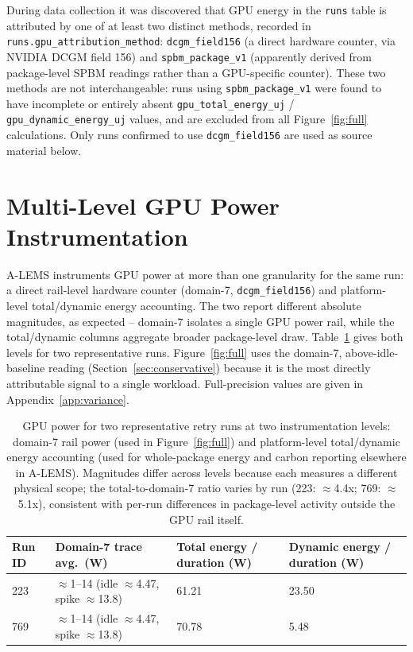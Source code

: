 \documentclass[10pt]{article}
\begin{document}
During data collection it was discovered that GPU energy in the
\texttt{runs} table is attributed by one of at least two distinct methods,
recorded in \texttt{runs.gpu\_attribution\_method}: \texttt{dcgm\_field156}
(a direct hardware counter, via NVIDIA DCGM field 156) and
\texttt{spbm\_package\_v1} (apparently derived from package-level SPBM
readings rather than a GPU-specific counter). These two methods are not
interchangeable: runs using \texttt{spbm\_package\_v1} were found to have
incomplete or entirely absent \texttt{gpu\_total\_energy\_uj} /
\texttt{gpu\_dynamic\_energy\_uj} values, and are excluded from all
Figure~\ref{fig:full} calculations. Only runs confirmed to use \texttt{dcgm\_field156}
are used as source material below.

\section{Multi-Level GPU Power Instrumentation}
\label{sec:reconciliation}

A-LEMS instruments GPU power at more than one granularity for the same run:
a direct rail-level hardware counter (domain-7, \texttt{dcgm\_field156}) and
platform-level total/dynamic energy accounting. The two report different
absolute magnitudes, as expected -- domain-7 isolates a single GPU power
rail, while the total/dynamic columns aggregate broader package-level draw.
Table~\ref{tab:reconciliation} gives both levels for two representative
runs. Figure~\ref{fig:full} uses the domain-7, above-idle-baseline reading
(Section~\ref{sec:conservative}) because it is the most directly
attributable signal to a single workload. Full-precision values are given
in Appendix~\ref{app:variance}.

\begin{table}[h]
\centering
\small
\begin{tabularx}{\textwidth}{lXXX}
\toprule
\textbf{Run ID} & \textbf{Domain-7 trace avg.\ (W)} & \textbf{Total energy / duration (W)} & \textbf{Dynamic energy / duration (W)} \\
\midrule
223 & $\approx$1--14 (idle $\approx$4.47, spike $\approx$13.8) & 61.21 & 23.50 \\
769 & $\approx$1--14 (idle $\approx$4.47, spike $\approx$13.8) & 70.78 & 5.48 \\
\bottomrule
\end{tabularx}
\vspace{-2pt}
\caption{GPU power for two representative retry runs at two instrumentation
levels: domain-7 rail power (used in Figure~\ref{fig:full}) and platform-level
total/dynamic energy accounting (used for whole-package energy and carbon
reporting elsewhere in A-LEMS). Magnitudes differ across levels because each
measures a different physical scope; the total-to-domain-7 ratio varies by
run (223: $\approx$4.4x; 769: $\approx$5.1x), consistent with per-run
differences in package-level activity outside the GPU rail itself.}
\label{tab:reconciliation}
\end{table}
\end{document}
